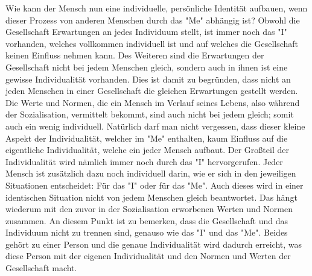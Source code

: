 Wie kann der Mensch nun eine individuelle, persönliche Identität aufbauen, wenn dieser Prozess von anderen Menschen durch das "Me" abhängig ist?
Obwohl die Gesellschaft Erwartungen an jedes Individuum stellt, ist immer noch das "I" vorhanden, welches vollkommen individuell ist und auf welches die Gesellschaft keinen Einfluss nehmen kann.
Des Weiteren sind die Erwartungen der Gesellschaft nicht bei jedem Menschen gleich, sondern auch in ihnen ist eine gewisse Individualität vorhanden.
Dies ist damit zu begründen, dass nicht an jeden Menschen in einer Gesellschaft die gleichen Erwartungen gestellt werden.
Die Werte und Normen, die ein Mensch im Verlauf seines Lebens, also während der Sozialisation, vermittelt bekommt, sind auch nicht bei jedem gleich; somit auch ein wenig individuell.
Natürlich darf man nicht vergessen, dass dieser kleine Aspekt der Individualität, welcher im "Me" enthalten, kaum Einfluss auf die eigentliche Individualität, welche ein jeder Mensch aufbaut.
Der Großteil der Individualität wird nämlich immer noch durch das "I" hervorgerufen.
Jeder Mensch ist zusätzlich dazu noch individuell darin, wie er sich in den jeweiligen Situationen entscheidet: Für das "I" oder für das "Me". Auch dieses wird in einer identischen Situation nicht von jedem Menschen gleich beantwortet. Das hängt wiederum mit den zuvor in der Sozialisation erworbenen Werten und Normen zusammen.
An diesem Punkt ist zu bemerken, dass die Gesellschaft und das Individuum nicht zu trennen sind, genauso wie das "I" und das "Me".
Beides gehört zu einer Person und die genaue Individualität wird dadurch erreicht, was diese Person mit der eigenen Individualität und den Normen und Werten der Gesellschaft macht.
